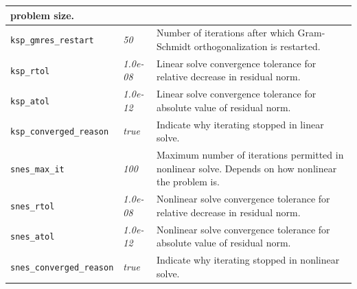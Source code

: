 \begin{center}
\begin{table}[H]
\begin{tabular}{|>{\raggedright}p{2in}|>{\centering}m{0.75in}|>{\raggedright}p{3in}|}
problem size.\tabularnewline
\hline 
\texttt{ksp\_gmres\_restart} & \textit{50} & Number of iterations after which Gram-Schmidt orthogonalization is
restarted.\tabularnewline
\hline 
\texttt{ksp\_rtol} & \textit{1.0e-08} & Linear solve convergence tolerance for relative decrease in residual
norm.\tabularnewline
\hline 
\texttt{ksp\_atol} & \textit{\emph{1.0e-12}} & Linear solve convergence tolerance for absolute value of residual
norm.\tabularnewline
\hline 
\texttt{ksp\_converged\_reason} & \textit{true} & Indicate why iterating stopped in linear solve.\tabularnewline
\hline 
\texttt{snes\_max\_it} & \textit{100} & Maximum number of iterations permitted in nonlinear solve. Depends
on how nonlinear the problem is.\tabularnewline
\hline 
\texttt{snes\_rtol} & \textit{1.0e-08} & Nonlinear solve convergence tolerance for relative decrease in residual
norm.\tabularnewline
\hline 
\texttt{snes\_atol} & \textit{1.0e-12} & Nonlinear solve convergence tolerance for absolute value of residual
norm.\tabularnewline
\hline 
\texttt{snes\_converged\_reason} & \textit{true} & Indicate why iterating stopped in nonlinear solve.\tabularnewline
\hline 
\end{tabular}
\end{table}

\par\end{center}

